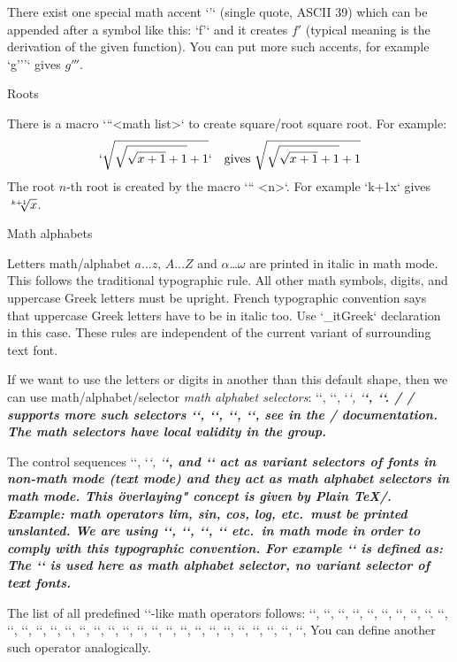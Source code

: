 There exist one special math accent `'` (single quote, ASCII 39)
which can be appended after a symbol like this: `f'`
and it creates $f'$ (typical meaning is the
derivation of the given function). You can put more such accents, for
example `g'''` gives $g'''$.

\secc Roots

There is a macro \x`\sqrt``{<math list>}` to create \ii square/root square root. For example:
$$
  `\sqrt{\sqrt{\sqrt{x+1}+1}+1}` \quad \hbox{gives }
   \sqrt{\sqrt{\sqrt{x+1}+1}+1}
$$
The \ii root $n$-th root is created by the macro \x`\root`` <n>`. For
example `\root k+1\of x` gives $\root k+1\of x$.

\secc Math alphabets

Letters \ii math/alphabet $a\dots z$, $A\dots Z$ and $\alpha$\dots$\omega$ are printed in italic
in math mode. This follows the traditional typographic rule.
All other math symbols, digits, and uppercase Greek letters must be
upright.\fnote
{French typographic convention says that uppercase Greek letters have to be
 in italic too. Use `\_itGreek` declaration in this case.}
These rules are independent of the current variant of surrounding text font.

If we want to use the letters or digits
in another than this default shape, then we can use
\ii math/alphabet/selector {\em math alphabet selectors}:
\x`\mit`, \x`\rm`, \x`\it`, \x`\bf`, \x`\cal`.
\new \OpTeX/
\OpTeX/ supports more such selectors \x`\script`, \x`\frak`, \x`\bbchar`, \x`\bi`, see
 in the \OpTeX/ documentation.
The math selectors have local validity in the group.

The control sequences \x`\rm`, \x`\it`, \x`\bf`, and \x`\bi` act as variant selectors
of fonts in non-math mode (text mode) and they act
as math alphabet selectors in math mode. This \"overlaying" concept
is given by Plain \TeX/. Example: math operators lim, sin, cos,
log, etc.\ must be printed unslanted. We are using `\lim`, `\sin`, `\cos`,
`\log` etc.\ in math mode in order to comply with this typographic convention. For
example `\sin` is defined as:
\begtt
\def\sin {\mathop{\rm sin}\nolimits}
\endtt
The `\rm` is used here as math alphabet selector, no variant selector of
text fonts.

The list of all predefined `\rm`-like math operators follows: \x`\arccos`,
\x`\arcsin`, \x`\arctan`, \x`\arg`, \x`\cos`, \x`\cosh`, \x`\cot`, \x`\coth`, \x`\deg`.
\x`\det`, \x`\dim`, \x`\exp`, \x`\gcd`, \x`\hom`, \x`\inf`, \x`\ker`, \x`\lg`, \x`\lim`,
\x`\liminf`, \x`\limsup`, \x`\ln`, \x`\log`, \x`\max`, \x`\min`, \x`\Pr`, \x`\scs`, \x`\sin`,
\x`\sinh`, \x`\sup`, \x`\tan`, \x`\tanh`, You can define another such operator
analogically.

